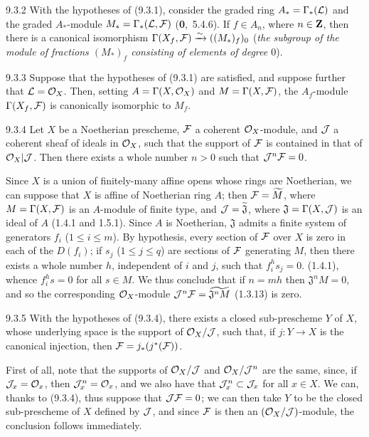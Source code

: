 \documentclass[../main.tex]{subfiles}
\begin{document}
\begin{env}[Corollary]{9.3.2}
    With the hypotheses of {\normalfont(9.3.1)}, consider the graded ring $A_*=\Gamma_*(\mathcal{L})$ and the graded $A_*$-module $M_*=\Gamma_*(\mathcal{L},\mathcal{F})$ {\normalfont(\textbf{0},~5.4.6)}.
    If $f\in A_n$, where $n\in\mathbf{Z}$, then there is a canonical isomorphism $\Gamma(X_f,\mathcal{F})\xrightarrow{\sim}((M_*)_f)_0$ (\emph{the subgroup of the module of fractions $(M_*)_f$ consisting of elements of degree $0$}).
\end{env}
\begin{env}[Corollary]{9.3.3}
    Suppose that the hypotheses of {\normalfont(9.3.1)} are satisfied, and suppose further that $\mathcal{L}=\mathcal{O}_X$.
    Then, setting $A=\Gamma(X,\mathcal{O}_X)$ and $M=\Gamma(X,\mathcal{F})$, the $A_f$-module $\Gamma(X_f,\mathcal{F})$ is canonically isomorphic to $M_f$.
\end{env}
\begin{env}[Proposition]{9.3.4}
    Let $X$ be a Noetherian prescheme, $\mathcal{F}$ a coherent $\mathcal{O}_X$-module, and $\mathcal{J}$ a coherent sheaf of ideals in $\mathcal{O}_X$, such that the support of $\mathcal{F}$ is contained in that of $\mathcal{O}_X|\mathcal{J}$.
    Then there exists a whole number $n>0$ such that $\mathcal{J}^n\mathcal{F}=0$.
\end{env}

Since $X$ is a union of finitely-many affine opens whose rings are Noetherian, we can suppose that $X$ is affine of Noetherian ring $A$; then $\mathcal{F}=\widetilde{M}$, where $M=\Gamma(X,\mathcal{F})$ is an $A$-module of finite type, and $\mathcal{J}=\widetilde{\mathfrak{J}}$, where $\mathfrak{J}=\Gamma(X,\mathcal{J})$ is an ideal of $A$ (1.4.1 and 1.5.1).
Since $A$ is Noetherian, $\mathfrak{J}$ admits a finite system of generators $f_i$ ($1\leq i\leq m$).
By hypothesis, every section of $\mathcal{F}$ over $X$ is zero in each of the $D(f_i)$; if $s_j$ ($1\leq j\leq q$) are sections of $\mathcal{F}$ generating $M$, then there exists a whole number $h$, independent of $i$ and $j$, such that $f_i^h s_j=0$. (1.4.1), whence $f_i^h s=0$ for all $s\in M$.
We thus conclude that if $n=mh$ then $\mathfrak{J}^n M=0$, and so the corresponding $\mathcal{O}_X$-module $\mathcal{J}^n\mathcal{F}=\widetilde{\mathfrak{J}^nM}$ (1.3.13) is zero.

\begin{env}[Corollary]{9.3.5}
    With the hypotheses of {\normalfont(9.3.4)}, there exists a closed sub-prescheme $Y$ of $X$, whose underlying space is the support of $\mathcal{O}_X/\mathcal{J}$, such that, if $j\colon Y\to X$ is the canonical injection, then $\mathcal{F}=j_*(j^*(\mathcal{F}))$.
\end{env}

First of all, note that the supports of $\mathcal{O}_X/\mathcal{J}$ and $\mathcal{O}_X/\mathcal{J}^n$ are the same, since, if $\mathcal{J}_x=\mathcal{O}_x$, then $\mathcal{J}_x^n=\mathcal{O}_x$, and we also have that $\mathcal{J}_x^n\subset\mathcal{J}_x$ for all $x\in X$.
We can, thanks to (9.3.4), thus suppose that $\mathcal{J}\mathcal{F}=0$; we can then take $Y$ to be the closed sub-prescheme of $X$ defined by $\mathcal{J}$, and since $\mathcal{F}$ is then an $(\mathcal{O}_X/\mathcal{J})$-module, the conclusion follows immediately.
\end{document}
